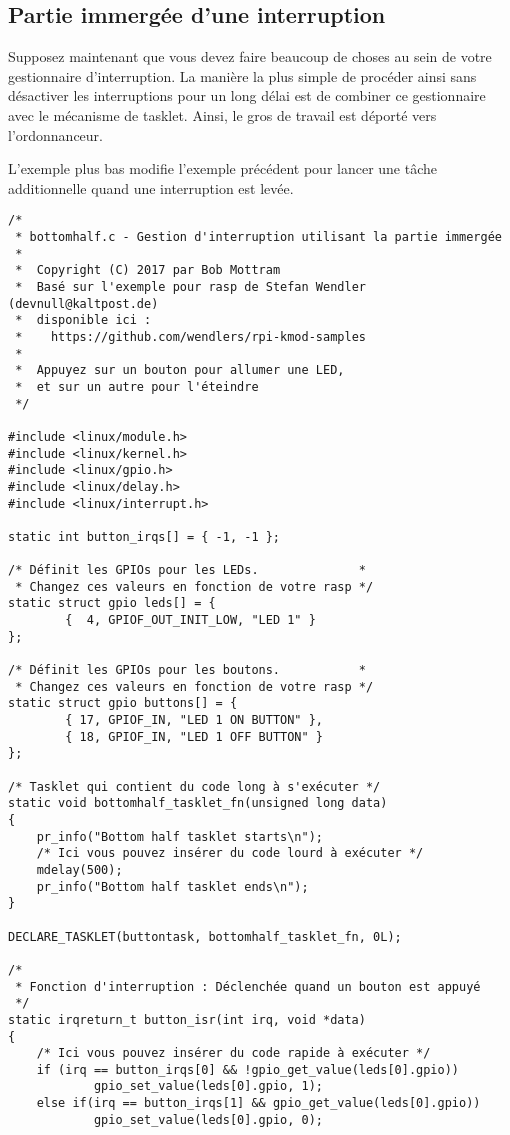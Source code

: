 \documentclass[11pt]{article}
\begin{document}
\subsection*{Partie immergée d'une interruption}
\label{sec-15-3}

Supposez maintenant que vous devez faire beaucoup de choses au sein de votre gestionnaire d'interruption. La manière la plus simple de procéder ainsi sans désactiver les interruptions pour un long délai est de combiner ce gestionnaire avec le mécanisme de tasklet. Ainsi, le gros de travail est déporté vers l'ordonnanceur.

L'exemple plus bas modifie l'exemple précédent pour lancer une tâche additionnelle quand une interruption est levée.

\begin{verbatim}
/*
 * bottomhalf.c - Gestion d'interruption utilisant la partie immergée
 *
 *  Copyright (C) 2017 par Bob Mottram
 *  Basé sur l'exemple pour rasp de Stefan Wendler (devnull@kaltpost.de)
 *  disponible ici :
 *    https://github.com/wendlers/rpi-kmod-samples
 *
 *  Appuyez sur un bouton pour allumer une LED,
 *  et sur un autre pour l'éteindre
 */

#include <linux/module.h>
#include <linux/kernel.h>
#include <linux/gpio.h>
#include <linux/delay.h>
#include <linux/interrupt.h>

static int button_irqs[] = { -1, -1 };

/* Définit les GPIOs pour les LEDs.              *
 * Changez ces valeurs en fonction de votre rasp */
static struct gpio leds[] = {
        {  4, GPIOF_OUT_INIT_LOW, "LED 1" }
};

/* Définit les GPIOs pour les boutons.           *
 * Changez ces valeurs en fonction de votre rasp */
static struct gpio buttons[] = {
        { 17, GPIOF_IN, "LED 1 ON BUTTON" },
        { 18, GPIOF_IN, "LED 1 OFF BUTTON" }
};

/* Tasklet qui contient du code long à s'exécuter */
static void bottomhalf_tasklet_fn(unsigned long data)
{
    pr_info("Bottom half tasklet starts\n");
    /* Ici vous pouvez insérer du code lourd à exécuter */
    mdelay(500);
    pr_info("Bottom half tasklet ends\n");
}

DECLARE_TASKLET(buttontask, bottomhalf_tasklet_fn, 0L);

/*
 * Fonction d'interruption : Déclenchée quand un bouton est appuyé
 */
static irqreturn_t button_isr(int irq, void *data)
{
    /* Ici vous pouvez insérer du code rapide à exécuter */
    if (irq == button_irqs[0] && !gpio_get_value(leds[0].gpio))
            gpio_set_value(leds[0].gpio, 1);
    else if(irq == button_irqs[1] && gpio_get_value(leds[0].gpio))
            gpio_set_value(leds[0].gpio, 0);


\end{verbatim}
\end{document}
